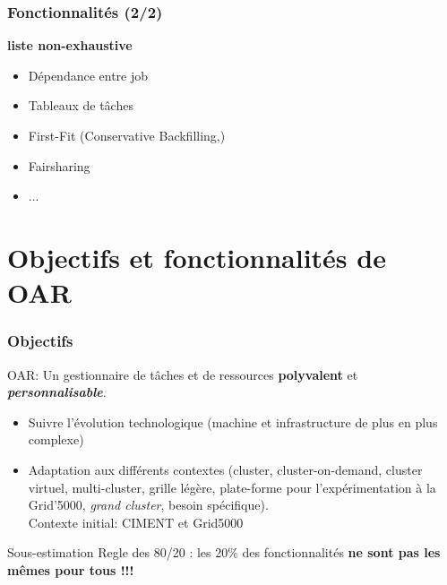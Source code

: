\documentclass{beamer}
\begin{document}
\begin{frame}
\frametitle{Fonctionnalités (2/2)}
	{\bf liste non-exhaustive}
		\begin{itemize}
    \item Dépendance entre job
    \item Tableaux de tâches
		\item First-Fit (Conservative Backfilling,)
		\item Fairsharing
    \item ... 
		
	\end{itemize}
\end{frame}


\section{Objectifs et fonctionnalités de OAR}


\begin{frame}
	\frametitle{Objectifs} \hypertarget{objectifs}{}

	OAR: Un gestionnaire de tâches et de ressources {\bf polyvalent} et {\bf {\em personnalisable}}.

	\begin{itemize}
		\item Suivre l'évolution technologique (machine et infrastructure de plus en plus complexe)
		\item Adaptation aux différents contextes (cluster, cluster-on-demand, cluster virtuel, multi-cluster, grille légère, plate-forme pour l'expérimentation à la Grid'5000, {\em grand cluster}, besoin spécifique). 
\\ Contexte initial: CIMENT \hyperlink{ciment-appendix}{ }  et Grid5000 \hyperlink{g5k-appendix}{ }
	\end{itemize}

\begin{alertblock}{Sous-estimation}
   Regle des 80/20 : les 20\% des fonctionnalités {\bf ne sont pas les mêmes pour tous !!!}  
\end{alertblock}

\end{frame}

\end{document}
